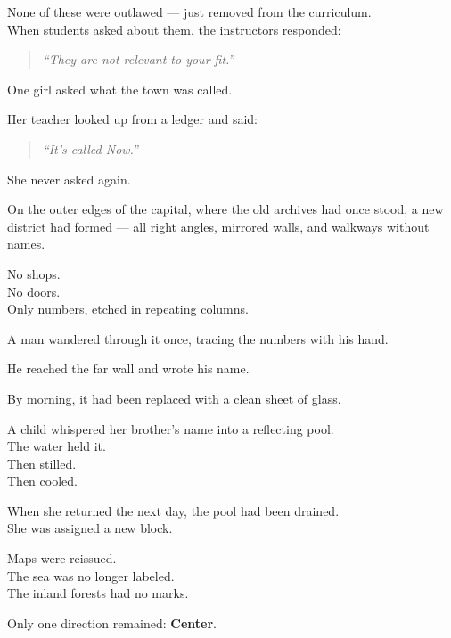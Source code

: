 \documentclass[9pt]{article}
\begin{document}
None of these were outlawed — just removed from the curriculum.\\
When students asked about them, the instructors responded:

\begin{quote}
\textit{“They are not relevant to your fit.”}
\end{quote}

\vspace{1em}

One girl asked what the town was called.

Her teacher looked up from a ledger and said:

\begin{quote}
\textit{“It’s called Now.”}
\end{quote}

She never asked again.

\vspace{1em}

On the outer edges of the capital, where the old archives had once stood, a new district had formed — all right angles, mirrored walls, and walkways without names.

No shops.\\
No doors.\\
Only numbers, etched in repeating columns.

A man wandered through it once, tracing the numbers with his hand.

He reached the far wall and wrote his name.

By morning, it had been replaced with a clean sheet of glass.

\vspace{1em}

A child whispered her brother’s name into a reflecting pool.\\
The water held it.\\
Then stilled.\\
Then cooled.

When she returned the next day, the pool had been drained.\\
She was assigned a new block.

\vspace{1em}

Maps were reissued.\\
The sea was no longer labeled.\\
The inland forests had no marks.

Only one direction remained: \textbf{Center}.
\end{document}
